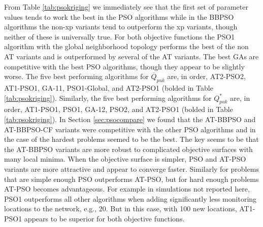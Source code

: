 \documentclass[cmbright]{staauth}
\begin{document}
From Table \ref{tab:psokriging} we immediately see that the first set of parameter values tends to work the best in the PSO algorithms while in the BBPSO algorithms the non-xp variants tend to outperform the xp variants, though neither of these is universally true. For both objective functions the PSO1 algorithm with the global neighborhood topology performs the best of the non AT variants and is outperformed by several of the AT variants. The best GAs are competitive with the best PSO algorithms, though they appear to be slightly worse. The five best performing algorithms for $\overline{Q}_{puk}$ are, in order, AT2-PSO2, AT1-PSO1, GA-11, PSO1-Global, and AT2-PSO1 (bolded in Table \ref{tab:psokriging}). Similarly, the five best performing algorithms for $Q^*_{puk}$ are, in order, AT1-PSO1, PSO1, GA-12, PSO2, and AT2-PSO1 (bolded in Table \ref{tab:psokriging}). In Section \ref{sec:psocompare} we found that the AT-BBPSO and AT-BBPSO-CF variants were competitive with the other PSO algorithms and in the case of the hardest problems seemed to be the best. The key seems to be that the AT-BBPSO variants are more robust to complicated objective surfaces with many local minima. When the objective surface is simpler, PSO and AT-PSO variants are more attractive and appear to converge faster. Similarly for problems that are simple enough PSO outperforms AT-PSO, but for hard enough problems AT-PSO becomes advantageous. For example in simulations not reported here, PSO1 outperforms all other algorithms when adding significantly less monitoring locations to the network, e.g., 20. But in this case, with 100 new locations, AT1-PSO1 appears to be superior for both objective functions. 
\end{document}
